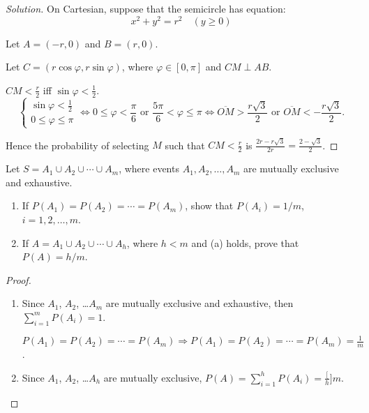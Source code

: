 \documentclass[class=probandstats,crop=false]{standalone}
\begin{document}
\begin{proof}[Solution]
    \par On Cartesian, suppose that the semicircle has equation:
    \[
        x^{2} + y^{2} = r^{2}\quad (y \ge 0)
    \]
    \par Let $A = (-r, 0)$ and $B = (r, 0)$.
    \par Let $C = (r\cos\varphi, r\sin\varphi)$, where $\varphi\in[0,\pi]$ and $CM\perp AB$.
    \par $CM < \frac{r}{2}$ iff $\sin\varphi < \frac{1}{2}$.
    \[
        \begin{cases}
            \sin\varphi < \frac{1}{2} \\
            0\le \varphi\le \pi
        \end{cases}
        \Leftrightarrow
        0\le\varphi < \frac{\pi}{6} \text{ or } \frac{5\pi}{6} < \varphi \le\pi
        \Leftrightarrow
        \overline{OM} > \frac{r\sqrt{3}}{2} \text{ or } \overline{OM} < -\frac{r\sqrt{3}}{2}.
    \]
    \par Hence the probability of selecting $M$ such that $CM < \frac{r}{2}$ is $\frac{2r - r\sqrt{3}}{2r} = \frac{2 - \sqrt{3}}{2}$.
\end{proof}

\begin{exercise}
    \par Let $S = A_{1} \cup A_{2} \cup \cdots \cup A_{m}$, where events $A_{1}, A_{2}, \ldots, A_{m}$ are mutually exclusive and exhaustive.
    \begin{enumerate}[label = \textbf{(\alph*)}]
        \item If $P(A_{1}) = P(A_{2}) = \cdots = P(A_{m})$, show that $P(A_{i}) = 1/m$, $i = 1, 2, \ldots, m$.
        \item If $A = A_{1}\cup A_{2}\cup \cdots\cup A_{h}$, where $h < m$ and (a) holds, prove that $P(A) = h/m$.
    \end{enumerate}
\end{exercise}

\begin{proof}
    \begin{enumerate}[label = \textbf{(\alph*)}]
        \item Since $A_{1}$, $A_{2}$, \ldots $A_{m}$ are mutually exclusive and exhaustive, then $\sum^{m}_{i=1}P(A_{i}) = 1$.
            \par $P(A_{1}) = P(A_{2}) = \cdots = P(A_{m}) \Longrightarrow P(A_{1}) = P(A_{2}) = \cdots = P(A_{m}) = \frac{1}{m}$.
        \item Since $A_{1}$, $A_{2}$, \ldots $A_{h}$ are mutually exclusive, $P(A) = \sum^{h}_{i=1}P(A_{i}) = \frac[h]{m}$.
    \end{enumerate}
\end{proof}
\end{document}
